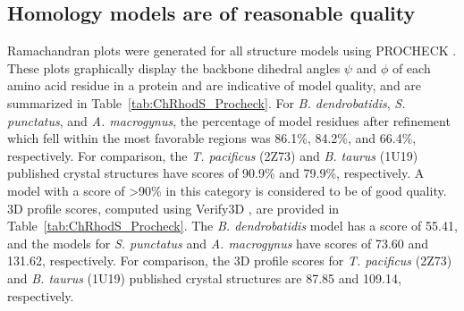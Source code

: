\subsection*{Homology models are of reasonable quality}
Ramachandran plots were generated for all structure models using PROCHECK \cite{Laskowski1993,Wiederstein2007}. These plots graphically display the backbone dihedral angles $\psi$ and $\phi$ of each amino acid residue in a protein and are indicative of model quality, and are summarized in Table~\ref{tab:ChRhodS_Procheck}. For \textit{B. dendrobatidis}, \textit{S. punctatus}, and \textit{A. macrogynus}, the percentage of model residues after refinement which fell within the most favorable regions was 86.1\%, 84.2\%, and 66.4\%, respectively. For comparison, the \textit{T. pacificus} (2Z73) and \textit{B. taurus} (1U19) published crystal structures have scores of 90.9\% and 79.9\%, respectively. A model with a score of \textgreater 90\% in this category is considered to be of good quality.\\
\indent 3D profile scores, computed using Verify3D \cite{Luthy1992}, are provided in Table~\ref{tab:ChRhodS_Procheck}. The \textit{B. dendrobatidis} model has a score of 55.41, and the models for \textit{S. punctatus} and \textit{A. macrogynus} have scores of 73.60 and 131.62, respectively. For comparison, the 3D profile scores for \textit{T. pacificus} (2Z73) and \textit{B. taurus} (1U19) published crystal structures are 87.85 and 109.14, respectively.
